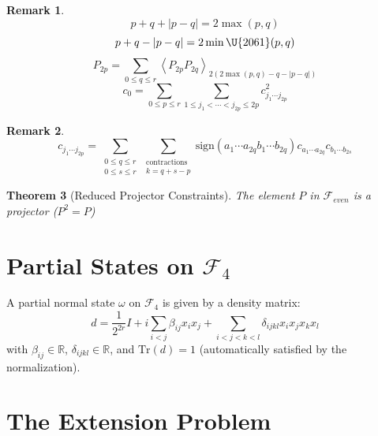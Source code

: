 \documentclass[aps,preprint]{revtex4}
\newtheorem{theorem}{Theorem}
\newtheorem{remark}[theorem]{Remark}
\begin{document}
\begin{remark}
\begin{equation}
p+q+\left\vert p-q\right\vert =2\max (p,q)
\end{equation}%
\begin{equation}
p+q-\left\vert p-q\right\vert =2\min \U{2061} (p,q)
\end{equation}%
\begin{equation}
P_{2p}=\sum_{0\leq q\leq r}\left\langle P_{2p}P_{2q}\right\rangle _{2\left(
2\max (p,q)-q-\left\vert p-q\right\vert \right) }
\end{equation}%
\begin{equation}
c_{0}=\sum_{0\leq p\leq r}\sum_{1\leq j_{1}<\cdots <j_{2p}\leq
2p}c_{j_{1}\cdots j_{2p}}^{2}
\end{equation}
\end{remark}

\begin{remark}
\begin{equation}
c_{j_{1}\cdots j_{2p}}=\sum_{\substack{ 0\leq q\leq r  \\ 0\leq s\leq r}}%
\sum _{\substack{ \text{contractions }  \\ k=q+s-p}}\text{sign}\left(
a_{1}\cdots a_{2q}b_{1}\cdots b_{2q}\right) c_{a_{1}\cdots
a_{2q}}c_{b_{1}\cdots b_{2s}}
\end{equation}
\end{remark}

\begin{theorem}[Reduced Projector Constraints]
The element $P$ in $\mathcal{F}_{even}$ is a projector ($P^{2}=P$)
\end{theorem}

\section{Partial States on $\mathcal{F}_{4}$}

A partial normal state $\omega $ on $\mathcal{F}_{4}$ is given by a density
matrix: 
\begin{equation}
d=\frac{1}{2^{2r}}I+i\sum_{i<j}\beta _{ij}x_{i}x_{j}+\sum_{i<j<k<l}\delta
_{ijkl}x_{i}x_{j}x_{k}x_{l}
\end{equation}%
with $\beta _{ij}\in \mathbb{R}$, $\delta _{ijkl}\in \mathbb{R}$, and $%
\mathrm{Tr}(d)=1$ (automatically satisfied by the normalization).

\section{The Extension Problem}
\end{document}

